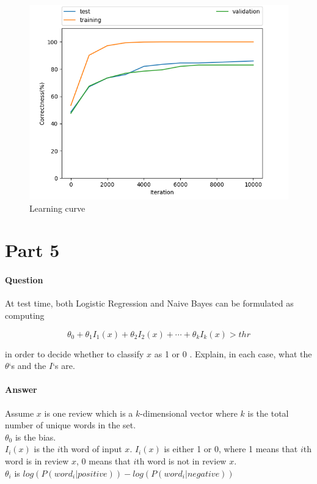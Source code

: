 \documentclass[11pt,twoside]{article}
\begin{document}
\begin{figure}[h]
	\centering
	\includegraphics[scale=0.8]{part4.png}
	\caption*{Learning curve}
\end{figure}

\clearpage

\section*{Part 5}
\paragraph{Question}
At test time, both Logistic Regression and Naive Bayes can be formulated as computing

\[\theta_0+\theta_1I_1(x)+\theta_2I_2(x)+\cdots+\theta_kI_k(x) > thr\]

in order to decide whether to classify $x$ as 1 or 0 . Explain, in each case, what the $\theta$‘s and the $I$‘s are.

\paragraph{Answer}
Assume $x$ is one review which is a $k$-dimensional vector where $k$ is the total number of unique words in the set.\\
$\theta_0$ is the bias.\\
$I_i(x)$ is the $i$th word of input $x$. $I_i(x)$ is either 1 or 0, where 1 means that $i$th word is in review $x$, 0 means that $i$th word is not in review $x$.\\
$\theta_i$ is $log(P(word_i | positive))  - log(P(word_i | negative))$
\clearpage
\end{document}

